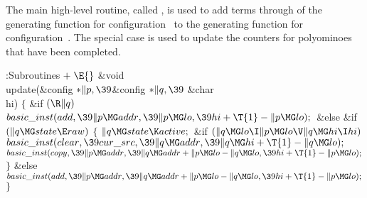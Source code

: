 The main high-level routine, called , is
used to add terms
 through  of the generating function for
configuration~
to the generating function for configuration~. The special case
 is used to update the counters for polyominoes that have been
completed.

\Y\B\4:Subroutines\X${}\mathrel+\E{}$\6
\&{void} \\{update}(\&{config} ${}{*}\|p,\39{}$\&{config} ${}{*}\|q,\39{}$%
\&{char} \\{hi})\1\1\2\2\6
${}\{{}$\1\6
\&{if} ${}(\R\|q){}$\1\5
${}\\{basic\_inst}(\\{add},\39\|p\MG\\{addr},\39\|p\MG\\{lo},\39\\{hi}+\T{1}-%
\|p\MG\\{lo});{}$\2\6
\&{else} \&{if} ${}(\|q\MG\\{state}\E\\{raw}){}$\5
${}\{{}$\1\6
${}\|q\MG\\{state}\K\\{active};{}$\6
\&{if} ${}(\|q\MG\\{lo}\I\|p\MG\\{lo}\V\|q\MG\\{hi}\I\\{hi}){}$\1\5
${}\\{basic\_inst}(\\{clear},\39\\{cur\_src},\39\|q\MG\\{addr},\39\|q\MG\\{hi}+%
\T{1}-\|q\MG\\{lo});{}$\2\6
${}\\{basic\_inst}(\\{copy},\39\|p\MG\\{addr},\39\|q\MG\\{addr}+\|p\MG\\{lo}-%
\|q\MG\\{lo},\39\\{hi}+\T{1}-\|p\MG\\{lo});{}$\6
\4${}\}{}$\5
\2\&{else}\1\5
${}\\{basic\_inst}(\\{add},\39\|p\MG\\{addr},\39\|q\MG\\{addr}+\|p\MG\\{lo}-\|q%
\MG\\{lo},\39\\{hi}+\T{1}-\|p\MG\\{lo});{}$\2\6
\4${}\}{}$\2\par
\fi

